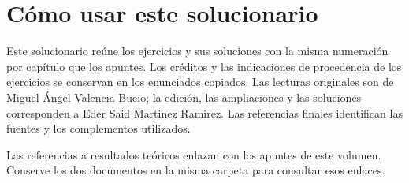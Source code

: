 \documentclass[11pt,letterpaper,oneside,openany]{book}
\begin{document}
\renewcommand{\bibname}{Referencias}
\frontmatter
\hypersetup{pageanchor=false}

\hypersetup{pageanchor=true}
\chapter*{Cómo usar este solucionario}
Este solucionario reúne los ejercicios y sus soluciones con la misma numeración
por capítulo que los apuntes. Los créditos y las indicaciones de procedencia de
los ejercicios se conservan en los enunciados copiados. Las lecturas originales
son de Miguel Ángel Valencia Bucio; la edición, las ampliaciones y las soluciones
corresponden a Eder Said Martinez Ramirez. Las referencias finales identifican
las fuentes y los complementos utilizados.

Las referencias a resultados teóricos enlazan con los apuntes de este volumen.
Conserve los dos documentos en la misma carpeta para consultar esos enlaces.
\hypertarget{indice-general}{}
\tableofcontents
\mainmatter

\backmatter
\renewcommand{\chaptermark}[1]{\markboth{#1}{}}

\end{document}
